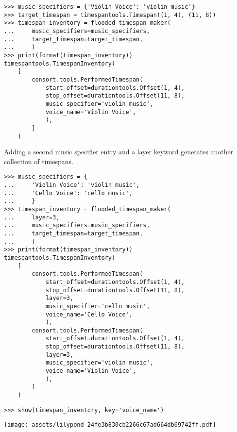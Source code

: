 \begin{singlespacing}
\vspace{-0.5\baselineskip}
\begin{lstlisting}
>>> music_specifiers = {'Violin Voice': 'violin music'}
>>> target_timespan = timespantools.Timespan((1, 4), (11, 8))
>>> timespan_inventory = flooded_timespan_maker(
...     music_specifiers=music_specifiers,
...     target_timespan=target_timespan,
...     )
>>> print(format(timespan_inventory))
timespantools.TimespanInventory(
    [
        consort.tools.PerformedTimespan(
            start_offset=durationtools.Offset(1, 4),
            stop_offset=durationtools.Offset(11, 8),
            music_specifier='violin music',
            voice_name='Violin Voice',
            ),
        ]
    )
\end{lstlisting}
\end{singlespacing}

Adding a second music specifier entry and a layer keyword generates another
collection of timespans.

\begin{comment}
<abjad>
music_specifiers = {
    'Violin Voice': 'violin music',
    'Cello Voice': 'cello music',
    }
timespan_inventory = flooded_timespan_maker(
    layer=3,
    music_specifiers=music_specifiers,
    target_timespan=target_timespan,
    )
print(format(timespan_inventory))
show(timespan_inventory, key='voice_name')
</abjad>
\end{comment}

\begin{singlespacing}
\vspace{-0.5\baselineskip}
\begin{lstlisting}
>>> music_specifiers = {
...     'Violin Voice': 'violin music',
...     'Cello Voice': 'cello music',
...     }
>>> timespan_inventory = flooded_timespan_maker(
...     layer=3,
...     music_specifiers=music_specifiers,
...     target_timespan=target_timespan,
...     )
>>> print(format(timespan_inventory))
timespantools.TimespanInventory(
    [
        consort.tools.PerformedTimespan(
            start_offset=durationtools.Offset(1, 4),
            stop_offset=durationtools.Offset(11, 8),
            layer=3,
            music_specifier='cello music',
            voice_name='Cello Voice',
            ),
        consort.tools.PerformedTimespan(
            start_offset=durationtools.Offset(1, 4),
            stop_offset=durationtools.Offset(11, 8),
            layer=3,
            music_specifier='violin music',
            voice_name='Violin Voice',
            ),
        ]
    )
\end{lstlisting}
\begin{lstlisting}
>>> show(timespan_inventory, key='voice_name')
\end{lstlisting}
\noindent\texttt{[image: assets/lilypond-24fe3b830cb2266c67ad664db69742ff.pdf]}
\end{singlespacing}

